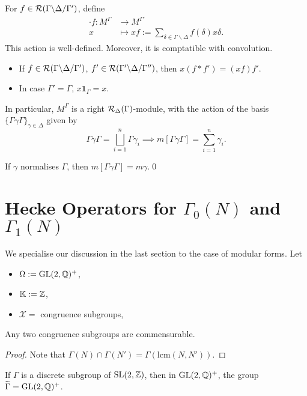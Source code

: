 \begin{defthm}
    For $f\in\mathcal{R}({\Gamma}\backslash {\Delta}\slash {\Gamma'})$, define \begin{align*}
        \cdot f : M^\Gamma &\longrightarrow M^{\Gamma'}\\
            x &\longmapsto xf :=
            \sum_{\delta\in\Gamma\backslash\Delta}
                f(\delta) x\delta.
    \end{align*}
    This action is well-defined.
    Moreover, it is comptatible with convolution.\begin{itemize}
        \item If $f\in\mathcal{R}({\Gamma}\backslash {\Delta}\slash {\Gamma'})$, $f'\in\mathcal{R}({\Gamma'}\backslash {\Delta}\slash {\Gamma''})$, then $x(f*f') = (xf)f'$.
        \item In case $\Gamma' = \Gamma$, $x \boldsymbol{1}_\Gamma = x$.
    \end{itemize}
    In particular, $M^\Gamma$ is a right $\mathcal{R}_\Delta(\Gamma)$-module,
    with the action of the basis $\{\Gamma\gamma\Gamma\}_{\gamma\in\Delta}$ given by \[\Gamma\gamma\Gamma = \bigsqcup_{i=1}^n \Gamma \gamma_i
    \implies m[\Gamma\gamma\Gamma] = \sum_{i=1}^n\gamma_i.\]
\end{defthm}
\begin{corollary}
    If $\gamma$ normalises $\Gamma$, then $m[\Gamma
    \gamma\Gamma] = m\gamma$.\qed
\end{corollary}

\section{\texorpdfstring{{Hecke Operators for $\Gamma_0(N)$ and $\Gamma_1(N)$}}{Hecke Operators for Gamma0(N) and Gamma1(N)}}

We specialise our discussion in the last section to the case of modular forms. Let \begin{itemize}
    \item $\Omega := \operatorname{GL}(2, \mathbb{Q})^+$,
    \item $\mathbb{K} := \mathbb{Z}$,
    \item $\mathscr{X} = $ congruence subgroups,
\end{itemize}

\begin{lemma}
    Any two congruence subgroups are commensurable.
\end{lemma}
\begin{proof}
    Note that $\Gamma(N)\cap \Gamma(N') = \Gamma(\mathrm{lcm}(N, N'))$.
\end{proof}
\begin{lemma}
    If $\Gamma$ is a discrete subgroup of $\operatorname{SL}(2,\mathbb{Z})$, then in $\operatorname{GL}(2, \mathbb{Q})^+$, the group $\widetilde{\Gamma} = \operatorname{GL}(2, \mathbb{Q})^+$.
\end{lemma}


